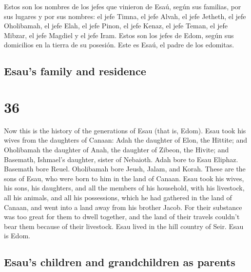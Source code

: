 \begin{paracol}{2}
 Estos son los nombres de los jefes que vinieron de Esaú,
según sus familias, por sus lugares y por sus nombres: el jefe Timna, el
jefe Alvah, el jefe Jetheth,  el jefe Oholibamah, el jefe
Elah, el jefe Pinon,  el jefe Kenaz, el jefe Teman, el
jefe Mibzar,  el jefe Magdiel y el jefe Iram. Estos son
los jefes de Edom, según sus domicilios en la tierra de su posesión.
Este es Esaú, el padre de los edomitas.

\switchcolumn
\begin{otherlanguage}{english}

\hypertarget{esaus-family-and-residence}{%
\subsection{Esau's family and
residence}\label{esaus-family-and-residence}}

\hypertarget{section-71}{%
\section{36}\label{section-71}}

 Now this is the history of the generations of Esau (that
is, Edom).  Esau took his wives from the daughters of
Canaan: Adah the daughter of Elon, the Hittite; and Oholibamah the
daughter of Anah, the daughter of Zibeon, the Hivite;  and
Basemath, Ishmael's daughter, sister of Nebaioth.  Adah
bore to Esau Eliphaz. Basemath bore Reuel.  Oholibamah
bore Jeush, Jalam, and Korah. These are the sons of Esau, who were born
to him in the land of Canaan.  Esau took his wives, his
sons, his daughters, and all the members of his household, with his
livestock, all his animals, and all his possessions, which he had
gathered in the land of Canaan, and went into a land away from his
brother Jacob.  For their substance was too great for them
to dwell together, and the land of their travels couldn't bear them
because of their livestock.  Esau lived in the hill
country of Seir. Esau is Edom.

\hypertarget{esaus-children-and-grandchildren-as-parents}{%
\subsection{Esau's children and grandchildren as
parents}\label{esaus-children-and-grandchildren-as-parents}}


\end{otherlanguage}
\end{paracol}
